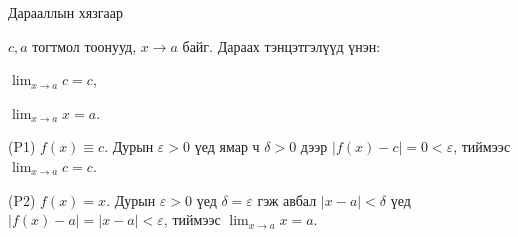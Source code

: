 \begin{frame}[allowframebreaks]{Дарааллын хязгаар}
\begin{theorem}\label{conslim}
$c,a$ тогтмол тоонууд, $x\to a$ байг. Дараах тэнцэтгэлүүд үнэн:
\begin{description}[leftmargin=2em]
  \item[(P1)] $\displaystyle\lim_{x\to a} c = c$,
  \item[(P2)] $\displaystyle\lim_{x\to a} x = a$.
\end{description}
\end{theorem}

\begin{prof}
(P1) $f(x)\equiv c$. Дурын $\varepsilon>0$ үед ямар ч $\delta>0$ дээр $|f(x)-c|=0<\varepsilon$, тиймээс $\lim_{x\to a}c=c$.

(P2) $f(x)=x$. Дурын $\varepsilon>0$ үед $\delta=\varepsilon$ гэж авбал $|x-a|<\delta$ үед $|f(x)-a|=|x-a|<\varepsilon$, тиймээс $\lim_{x\to a}x=a$.
\end{prof}
\end{frame}

